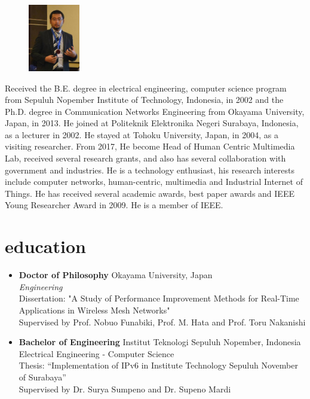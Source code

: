 \documentclass[]{friggeri-cv} %
\renewenvironment{entrylist}{%
  \begin{itemize}[leftmargin=1in]%
}{%
  \end{itemize}
}
\renewcommand{\entry}[4]{%
  \item[#1]
    \textbf{#2}%
    \hfill%
    {\footnotesize\addfontfeature{Color=lightgray} #3}\\%
    #4\vspace{\parsep}%
  }
\begin{document}
\begin{figure}
	\vspace{-10pt}
	\begin{center}
    \includegraphics[width=0.2\textwidth]{dhoto-jas.jpg}
    \end{center}
    
\end{figure}
Received the B.E. degree in electrical engineering, computer science program from Sepuluh Nopember Institute of Technology, Indonesia, in 2002 and the Ph.D. degree in Communication Networks Engineering from Okayama University, Japan, in 2013. He joined at Politeknik Elektronika Negeri Surabaya, Indonesia, as a lecturer in 2002. He stayed at Tohoku University, Japan, in 2004, as a visiting researcher. From 2017, He become Head of Human Centric Multimedia Lab, received several research grants, and also has several collaboration with government and industries. He is a technology enthusiast, his research interests include computer networks, human-centric, multimedia and Industrial Internet of Things. He has received several academic awards, best paper awards and IEEE Young Researcher Award in 2009. He is a member of IEEE.



\section{education}

\begin{entrylist}

\entry
{2009--2013}
{Doctor {\normalfont of Philosophy}}
{Okayama University, Japan}
{\emph{Engineering} \\ 
Dissertation: "A Study of Performance Improvement Methods for Real-Time Applications in Wireless Mesh Networks" \\
Supervised by Prof. Nobuo Funabiki, Prof. M. Hata and Prof. Toru Nakanishi}

\entry
{1997--2002}
{Bachelor {\normalfont of Engineering}}
{Institut Teknologi Sepuluh Nopember, Indonesia}
{Electrical Engineering - Computer Science\\
Thesis: “Implementation of IPv6 in Institute Technology Sepuluh November of Surabaya” 
\\Supervised by Dr. Surya Sumpeno and Dr. Supeno Mardi
}

\end{entrylist}
\end{document}
